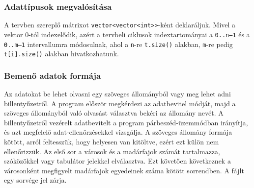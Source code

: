 \documentclass[a4paper]{article}
\begin{document}
        \subsubsection{Adattípusok megvalósítása}
        A tervben szereplő mátrixot \texttt{vector<vector<int>>}-ként deklaráljuk. Mivel a vektor 0-tól indexelődik, azért a tervbeli ciklusok indextartományai a \texttt{0..n–1} és a \texttt{0..m–1} intervallumra módosulnak, ahol a \texttt{n}-re \texttt{t.size()} alakban, \texttt{m}-re pedig \texttt{t[i].size()} alakban hivatkozhatunk.
        \subsubsection{Bemenő adatok formája}
        Az adatokat be lehet olvasni egy szöveges állományból vagy meg lehet adni billentyűzetről. A program először megkérdezi az adatbevitel módját, majd a szöveges állományból való olvasást választva bekéri az állomány nevét. A billentyűzetről vezérelt adatbevitelt a program párbeszéd-üzemmódban irányítja, és azt megfelelő adat-ellenőrzésekkel vizsgálja. A szöveges állomány formája kötött, arról feltesszük, hogy helyesen van kitöltve, ezért ezt külön nem ellenőrizzük. Az első sor a városok és a madárfajok számát tartalmazza, szóközökkel vagy tabulátor jelekkel elválasztva. Ezt követően következnek a városonként megfigyelt madárfajok egyedeinek száma kötött sorrendben. A fájlt egy sorvége jel zárja.
\end{document}
